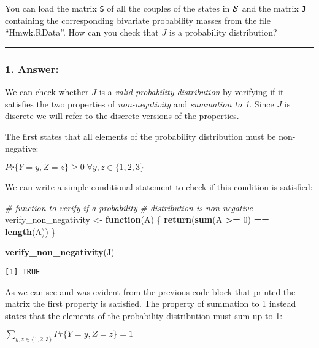 \documentclass[
]{article}
\newenvironment{Shaded}{\begin{snugshade}}{\end{snugshade}}
\newcommand{\CommentTok}[1]{\textcolor[rgb]{0.56,0.35,0.01}{\textit{#1}}}
\newcommand{\ControlFlowTok}[1]{\textcolor[rgb]{0.13,0.29,0.53}{\textbf{#1}}}
\newcommand{\DecValTok}[1]{\textcolor[rgb]{0.00,0.00,0.81}{#1}}
\newcommand{\FunctionTok}[1]{\textcolor[rgb]{0.13,0.29,0.53}{\textbf{#1}}}
\newcommand{\NormalTok}[1]{#1}
\newcommand{\OtherTok}[1]{\textcolor[rgb]{0.56,0.35,0.01}{#1}}
\newcommand{\SpecialCharTok}[1]{\textcolor[rgb]{0.81,0.36,0.00}{\textbf{#1}}}
\begin{document}
You can load the matrix \texttt{S} of all the couples of the states in
\({\cal S}\) and the matrix \texttt{J} containing the corresponding
bivariate probability masses from the file ``Hmwk.RData''. How can you
check that \(J\) is a probability distribution?

\begin{center}\rule{0.5\linewidth}{0.5pt}\end{center}

\hypertarget{answer}{%
\subsubsection{1. Answer:}\label{answer}}

We can check whether \(J\) is a \emph{valid probability distribution} by
verifying if it satisfies the two properties of \emph{non-negativity}
and \emph{summation to 1}. Since \(J\) is discrete we will refer to the
discrete versions of the properties.

The first states that all elements of the probability distribution must
be non-negative:

\(Pr \{Y=y,Z=z\} \ge 0 \; \forall y,z \in \{1, 2, 3\}\)

We can write a simple conditional statement to check if this condition
is satisfied:

\begin{Shaded}
\begin{Highlighting}[]
\CommentTok{\# function to verify if a probability}
\CommentTok{\# distribution is non{-}negative}
\NormalTok{verify\_non\_negativity }\OtherTok{\textless{}{-}} \ControlFlowTok{function}\NormalTok{(A) \{}
    \FunctionTok{return}\NormalTok{(}\FunctionTok{sum}\NormalTok{(A }\SpecialCharTok{\textgreater{}=} \DecValTok{0}\NormalTok{) }\SpecialCharTok{==} \FunctionTok{length}\NormalTok{(A))}
\NormalTok{\}}

\FunctionTok{verify\_non\_negativity}\NormalTok{(J)}
\end{Highlighting}
\end{Shaded}

\begin{verbatim}
[1] TRUE
\end{verbatim}

As we can see and was evident from the previous code block that printed
the matrix the first property is satisfied. The property of summation to
1 instead states that the elements of the probability distribution must
sum up to 1:

\(\sum_{y,z\in\{1,2,3\}}Pr\{Y=y,Z=z\}=1\)
\end{document}
